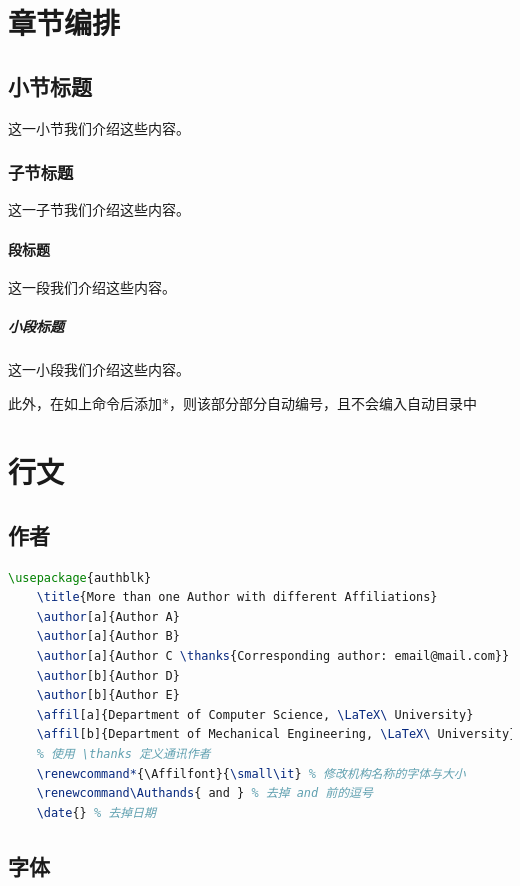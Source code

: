 \section{章节编排} %
\subsection{小节标题}这一小节我们介绍这些内容。
\subsubsection{子节标题}这一子节我们介绍这些内容。
\paragraph{段标题}这一段我们介绍这些内容。
\subparagraph{小段标题}这一小段我们介绍这些内容。

此外，在如上命令后添加*，则该部分部分自动编号，且不会编入自动目录中

\section{行文}

\subsection{作者}
\begin{lstlisting}[language={TeX}]
    \usepackage{authblk}
    \title{More than one Author with different Affiliations}
    \author[a]{Author A}
    \author[a]{Author B}
    \author[a]{Author C \thanks{Corresponding author: email@mail.com}}
    \author[b]{Author D}
    \author[b]{Author E}
    \affil[a]{Department of Computer Science, \LaTeX\ University}
    \affil[b]{Department of Mechanical Engineering, \LaTeX\ University}
    % 使用 \thanks 定义通讯作者
    \renewcommand*{\Affilfont}{\small\it} % 修改机构名称的字体与大小
    \renewcommand\Authands{ and } % 去掉 and 前的逗号
    \date{} % 去掉日期
\end{lstlisting}


\subsection{字体}
